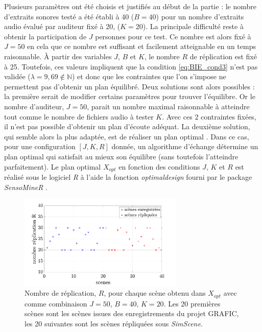 Plusieurs paramètres ont été choisis et justifiés au début de la partie : le nombre d'extraits sonores testé a été établi à 40 ($B = 40$) pour un nombre d'extraits audio évalué par auditeur fixé à 20, ($K = 20$). La principale difficulté reste à obtenir la participation de $J$ personnes pour ce test. Ce nombre est alors fixé à $J = 50$ en cela que ce nombre est suffisant et facilement atteignable en un temps raisonnable. À partir des variables $J$, $B$ et $K$, le nombre $R$ de réplication est fixé à 25. Toutefois, ces valeurs impliquent que la condition \ref{eq:BIE_cond3} n'est pas validée ($\lambda = 9,69 \notin \mathbb{N}$) et donc que les contraintes que l'on s'impose ne permettent pas d'obtenir un plan équilibré. Deux solutions sont alors possibles : la première serait de modifier certains paramètres pour trouver l'équilibre. Or le nombre d'auditeur, $J = 50$, parait un nombre maximal raisonnable à atteindre tout comme le nombre de fichiers audio à tester $K$. Avec ces 2 contraintes fixées, il n'est pas possible d'obtenir un plan d'écoute adéquat. La deuxième solution, qui semble alors la plus adaptée, est de réaliser un plan optimal \cite{pages_blocs_2007}. Dans ce cas, pour une configuration $\left[J, K, R\right]$ donnée, un algorithme d'échange détermine un \og plan optimal \fg{} qui satisfait au mieux son équilibre (sans toutefois l'atteindre parfaitement). Le plan optimal $X_{opt}$ en fonction des conditions $J$, $K$ et $R$ est réalisé sous le logiciel \textit{R} à l'aide la fonction \textit{optimaldesign} fourni par le package \textit{SensoMineR} \cite{le_sensominer_2008}.

\begin{figure}[ht]
\centering
\includegraphics[width = 0.7\textwidth]{./figures/test_perceptif/nb_replication.pdf}
\caption{Nombre de réplication, $R$, pour chaque scène obtenu dans $X_{opt}$ avec comme combinaison $J = 50$, $B = 40$, $K = 20$. Les 20 premières scènes sont les scènes issues des enregistrements du projet GRAFIC, les 20 suivantes sont les scènes répliquées sous \textit{SimScene}.}
\label{fig:replication}
\end{figure}


